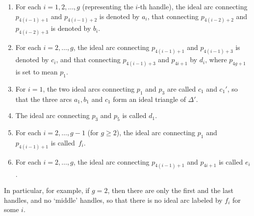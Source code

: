 \documentclass[10pt,a4paper]{amsart}
\numberwithin{equation}{section}
\theoremstyle{definition}
\begin{document}
\begin{enumerate}[label={\rm (IA\arabic*)}]\itemsep=0pt\setlength{\leftskip}{0.12cm}
\item For each $i = 1,2,\dots,g$ (representing the $i$-th handle), the ideal arc connecting $p_{4(i-1)+1}$ and $p_{4(i-1)+2}$ is denoted by $a_i$, that connecting $p_{4(i-2)+2}$ and $p_{4(i-2)+3}$ is denoted by $b_i$.
\item For each $i=2,\dots,g$, the ideal arc connecting $p_{4(i-1)+1}$ and $p_{4(i-1)+3}$ is denoted by $c_i$, and that connecting $p_{4(i-1)+3}$ and $p_{4i+1}$ by $d_i$, where $p_{4g+1}$ is set to mean $p_1$.
\item For $i=1$, the two ideal arcs connecting $p_1$ and $p_3$ are called $c_1$ and $c_1'$, so that the three arcs $a_1,b_1$ and $c_1$ form an ideal triangle of $\Delta'$.
\item The ideal arc connecting $p_3$ and $p_5$ is called $d_1$.
\item For each $i=2,\dots,g-1$ (for $g \ge 2$), the ideal arc connecting $p_1$ and $p_{4(i-1)+1}$ is called~$f_i$.
\item For each $i=2,\dots,g$, the ideal arc connecting $p_{4(i-1)+1}$ and $p_{4i+1}$ is called $e_i$.
\end{enumerate}
In particular, for example, if $g=2$, then there are only the first and the last handles, and no `middle' handles, so that there is no ideal arc labeled by $f_i$ for some $i$.
\end{document}
